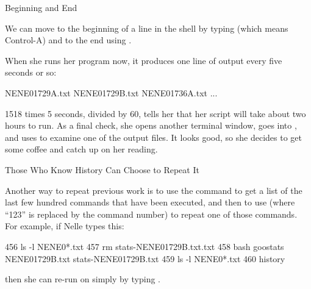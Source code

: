 \begin{swcbox}{Beginning and End}

We can move to the beginning of a line in the shell by typing
 (which means Control-A) and to the end using
.

\end{swcbox}

When she runs her program now, it produces one line of output every five
seconds or so:

\begin{VerbOut}
NENE01729A.txt
NENE01729B.txt
NENE01736A.txt
...
\end{VerbOut}

1518 times 5 seconds, divided by 60, tells her that her script will take
about two hours to run. As a final check, she opens another terminal
window, goes into , and uses
 to examine one of the output files. It
looks good, so she decides to get some coffee and catch up on her
reading.

\begin{swcbox}{Those Who Know History Can Choose to Repeat It}

Another way to repeat previous work is to use the 
command to get a list of the last few hundred commands that have been
executed, and then to use  (where ``123'' is replaced by
the command number) to repeat one of those commands. For example, if
Nelle types this:


\begin{VerbOut}
  456  ls -l NENE0*.txt
  457  rm stats-NENE01729B.txt.txt
  458  bash goostats NENE01729B.txt stats-NENE01729B.txt
  459  ls -l NENE0*.txt
  460  history
\end{VerbOut}

\noindent
then she can re-run  on  simply
by typing .

\end{swcbox}

